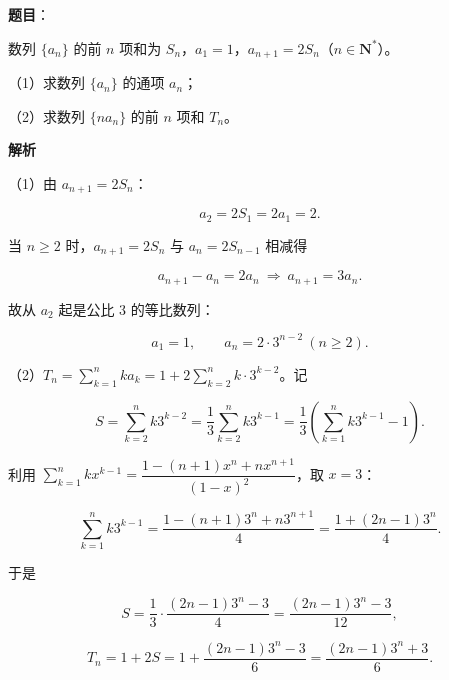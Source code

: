 \begin{answer}

\textbf{题目}：

数列 $\{a_n\}$ 的前 $n$ 项和为 $S_n$，$a_1=1$，$a_{n+1}=2S_n$（$n\in\mathbf N^*$）。

（1）求数列 $\{a_n\}$ 的通项 $a_n$；

（2）求数列 $\{na_n\}$ 的前 $n$ 项和 $T_n$。

\textbf{解析}

（1）由 $a_{n+1}=2S_n$：

\nopagebreak[4]
\[a_2=2S_1=2a_1=2.\]

当 $n\geqslant2$ 时，$a_{n+1}=2S_n$ 与 $a_n=2S_{n-1}$ 相减得

\nopagebreak[4]
\[a_{n+1}-a_n=2a_n\ \Longrightarrow\ a_{n+1}=3a_n.\]

故从 $a_2$ 起是公比 $3$ 的等比数列：

\nopagebreak[4]
\[a_1=1,\qquad a_n=2\cdot3^{n-2}\ (n\geqslant2).\]

（2）$T_n=\sum\limits_{k=1}^n ka_k=1+2\sum\limits_{k=2}^n k\cdot3^{k-2}$。记

\nopagebreak[4]
\[S=\sum_{k=2}^n k3^{k-2}=\frac13\sum_{k=2}^n k3^{k-1}
=\frac13\left(\sum_{k=1}^n k3^{k-1}-1\right).\]

利用 $\sum\limits_{k=1}^n kx^{k-1}=\dfrac{1-(n+1)x^n+nx^{n+1}}{(1-x)^2}$，取 $x=3$：

\nopagebreak[4]
\[\sum_{k=1}^n k3^{k-1}=\frac{1-(n+1)3^n+n3^{n+1}}4=\frac{1+(2n-1)3^n}4.\]

于是

\nopagebreak[4]
\[S=\frac13\cdot\frac{(2n-1)3^n-3}4=\frac{(2n-1)3^n-3}{12},\]

\nopagebreak[4]
\[T_n=1+2S=1+\frac{(2n-1)3^n-3}6=\frac{(2n-1)3^n+3}6.\]


\end{answer}
